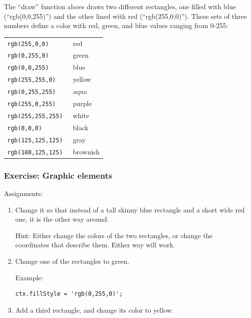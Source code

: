 \documentclass[11pt]{article}
\begin{document}
The ``draw'' function above draws two different rectangles, one filled
with blue (``rgb(0,0,255)'') and the other lined with red
(``rgb(255,0,0)'').  These sets of three numbers define a color with
red, green, and blue values ranging from 0-255:

\begin{center}
\begin{tabular}{ll}
\tt rgb(255,0,0) & red \\
\tt rgb(0,255,0) & green \\
\tt rgb(0,0,255) & blue \\
\tt rgb(255,255,0) & yellow \\
\tt rgb(0,255,255) & aqua \\
\tt rgb(255,0,255) & purple \\
\tt rgb(255,255,255) & white \\
\tt rgb(0,0,0) & black \\
\tt rgb(125,125,125) & gray \\
\tt rgb(180,125,125) & brownish \\
\end{tabular}
\end{center}

\subsubsection{Exercise: Graphic elements}

Assignments:

\begin{enumerate}

\item Change it so that instead of a tall skinny blue rectangle and a
  short wide red one, it is the other way around.

Hint: Either change the colors of the two rectangles, or change the
coordinates that describe them.  Either way will work.

\item Change one of the rectangles to green.

Example:

\begin{verbatim}
ctx.fillStyle = 'rgb(0,255,0)';
\end{verbatim}

\item Add a third rectangle, and change its color to yellow.

\end{enumerate}
\end{document}
